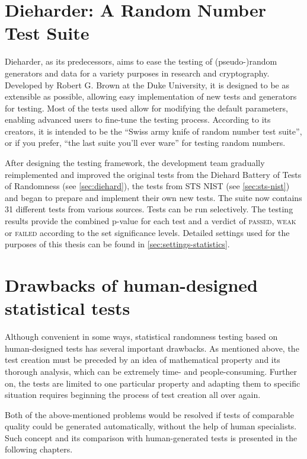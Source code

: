 \documentclass[12pt,oneside]{fithesis2}
\begin{document}
\section{Dieharder: A Random Number Test Suite}
\label{sec:dieharder}

Dieharder, as its predecessors, aims to ease the testing of (pseudo-)random generators and data for a variety purposes in research 
and cryptography. Developed by Robert G. Brown at the Duke University, it is designed to be as extensible as possible, 
allowing easy implementation of new tests and generators for testing. Most of the tests used allow for 
modifying the default parameters, enabling advanced users to fine-tune the testing process.
According to its creators, it is intended to be the ``Swiss army knife of random number test suite'', 
or if you prefer, ``the last suite you'll ever ware'' for testing random numbers. \parencite{dieharder}

After designing the testing framework, the development team gradually reimplemented and improved the original tests from 
the Diehard Battery of Tests of Randomness (see \autoref{sec:diehard}), 
the tests from STS NIST (see \autoref{sec:sts-nist}) and began to prepare and implement their own new tests.
The suite now contains 31 different tests from various sources. Tests can be run selectively.
The testing results provide the combined p-value for each test and a verdict of \textsc{passed}, \textsc{weak} or \textsc{failed}
according to the set significance levels.
Detailed settings used for the purposes of this thesis can be found in \autoref{sec:settings-statistics}.

\section{Drawbacks of human-designed statistical tests}
\label{sec:limits-stat-testing}

Although convenient in some ways, statistical randomness testing based on human-designed tests has several important drawbacks.
As mentioned above, the test creation must be preceded by an idea of mathematical property and its thorough analysis, 
which can be extremely time- and people-consuming. Further on, the tests are limited to one particular property and
adapting them to specific situation requires beginning the process of test creation all over again.

Both of the above-mentioned problems would be resolved if tests of comparable quality could be generated automatically, without 
the help of human specialists. Such concept and its comparison with human-generated tests is presented in the following chapters.
\end{document}
